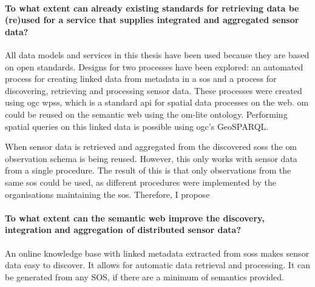 \paragraph{To what extent can already existing standards for retrieving data be (re)used for a service that supplies integrated and aggregated sensor data?}\mbox{}

All data models and services in this thesis have been used because they are based on open standards. Designs for two processes have been explored: an automated process for creating linked data from metadata in a \ac{sos} and a process for discovering, retrieving and processing sensor data. These processes were created using \ac{ogc} \aclp{wps}, which is a standard \ac{api} for spatial data processes on the web. \ac{om} could be reused on the semantic web using the om-lite ontology. Performing spatial queries on this linked data is possible using \ac{ogc}'s GeoSPARQL.

When sensor data is retrieved and aggregated from the discovered \aclp{sos} the \ac{om} observation schema is being reused. However, this only works with sensor data from a single procedure. The result of this is that only observations from the same \ac{sos} could be used, as different procedures were implemented by the organisations maintaining the \ac{sos}. Therefore, I propose 


\paragraph{To what extent can the semantic web improve the discovery, integration and aggregation of distributed sensor data?}\mbox{}

An online knowledge base with linked metadata extracted from \aclp{sos} makes sensor data easy to discover. It allows for automatic data retrieval and processing. It can be generated from any SOS, if there are a minimum of semantics provided. 
